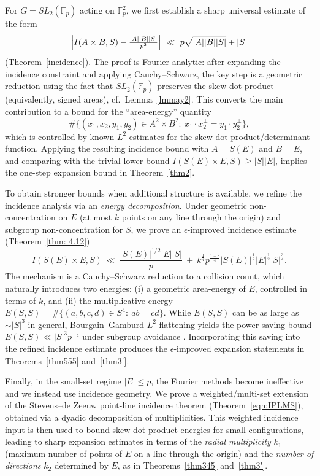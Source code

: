 \documentclass[11pt]{article}
\def\F{\mathcal{F}}
\def \F{{\mathbb F}}
\def\SL{SL}
\begin{document}
For $G=\SL_2(\F_p)$ acting on $\F_p^2$, we first establish a sharp universal estimate of the form
\[
\Bigl| I(A\times B,S)-\tfrac{|A||B||S|}{p^{2}} \Bigr|
\ \ll\ p\sqrt{|A||B||S|}+|S|
\]
(Theorem~\ref{incidence}).
The proof is Fourier-analytic: after expanding the incidence constraint and applying Cauchy--Schwarz, the key step is a geometric reduction using the fact that $\SL_2(\F_p)$ preserves the skew dot product (equivalently, signed areas), cf.\ Lemma~\ref{lmmay2}.
This converts the main contribution to a bound for the ``area-energy'' quantity
\[
\#\{(x_1,x_2,y_1,y_2)\in A^2\times B^2:\ x_1\cdot x_2^\perp=y_1\cdot y_2^\perp\},
\]
which is controlled by known $L^2$ estimates for the skew dot-product/determinant function.
Applying the resulting incidence bound with $A=S(E)$ and $B=E$, and comparing with the trivial lower bound
$I(S(E)\times E,S)\ge |S||E|$, implies the one-step expansion bound in Theorem~\ref{thm2}.

To obtain stronger bounds when additional structure is available, we refine the incidence analysis via an \emph{energy decomposition}.
Under geometric non-concentration on $E$ (at most $k$ points on any line through the origin) and subgroup non-concentration for $S$, we prove an $\epsilon$-improved incidence estimate (Theorem~\ref{thm: 4.12})
\[
I(S(E)\times E,S)\ \ll\ \frac{|S(E)|^{1/2}|E||S|}{p}
\ +\ k^{\frac{1}{4}}p^{\frac{1-\epsilon}{4}}|S(E)|^{\frac{1}{2}}|E|^{\frac{1}{2}}|S|^{\frac{3}{4}}.
\]
The mechanism is a Cauchy--Schwarz reduction to a collision count, which naturally introduces two energies:
(i) a geometric area-energy of $E$, controlled in terms of $k$, and
(ii) the multiplicative energy $E(S,S)=\#\{(a,b,c,d)\in S^4:\ ab=cd\}$.
While $E(S,S)$ can be as large as $\sim |S|^{3}$ in general, Bourgain--Gamburd $L^2$-flattening yields the power-saving bound
$E(S,S)\ll |S|^{3}p^{-\epsilon}$ under subgroup avoidance \cite{B.A.08}.
Incorporating this saving into the refined incidence estimate produces the $\epsilon$-improved expansion statements in Theorems~\ref{thm555} and~\ref{thm3'}.

Finally, in the small-set regime $|E|\le p$, the Fourier methods become ineffective and we instead use incidence geometry.
We prove a weighted/multi-set extension of the Stevens--de Zeeuw point-line incidence theorem (Theorem~\ref{eqn:IPLMS}), obtained via a dyadic decomposition of multiplicities.
This weighted incidence input is then used to bound skew dot-product energies for small configurations, leading to sharp expansion estimates in terms of the \emph{radial multiplicity} $k_1$ (maximum number of points of $E$ on a line through the origin) and the \emph{number of directions} $k_2$ determined by $E$, as in Theorems~\ref{thm345} and~\ref{thm3'}.
\end{document}

